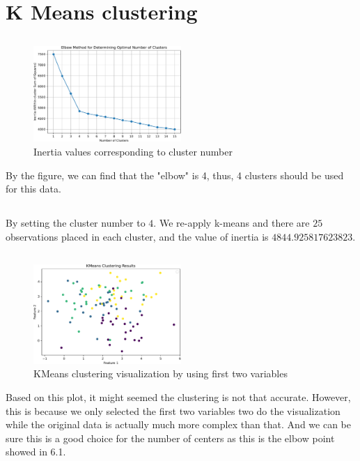 \documentclass{article}
\begin{document}
\section{K Means clustering}
\subsection{}
\begin{figure}[h]
    \begin{center}
        \includegraphics[width=0.5\textwidth]{./assist/elbow_method.pdf}
        \caption{Inertia values corresponding to cluster number}
    \end{center}
\end{figure}
By the figure, we can find that the "elbow" is 4, thus, 4 clusters should be used for this data.
\subsection{}
By setting the cluster number to $4$. We re-apply k-means and there are $25$ observations placed in each cluster, and the value of inertia is $4844.925817623823$.
\subsection{}
\begin{figure}[htbp]
    \begin{center}
        \includegraphics[width=0.5\textwidth]{./assist/kmeans_clustering_results.pdf}
        \caption{KMeans clustering visualization by using first two variables}
    \end{center}
\end{figure}
Based on this plot, it might seemed the clustering is not that accurate. However, this is because we only selected the first two variables two do the visualization while the original data is actually much more complex than that. And we can be sure this is a good choice for the number of centers as this is the elbow point showed in 6.1.
\end{document}
